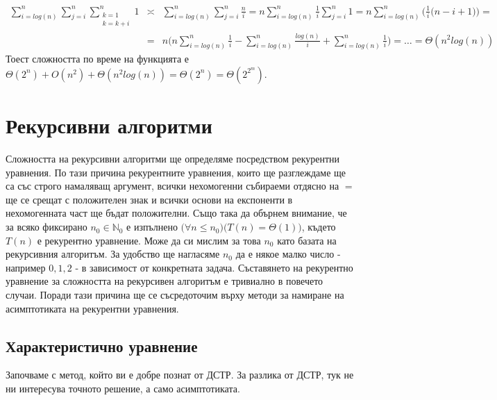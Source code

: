 \begin{solution}
	\begin{eqnarray*}
		\sum\limits_{i=log(n)}^n\sum\limits_{j=i}^n\sum\limits_{\substack{k=1\\k=k+i}}^n1 &\asymp&
		\sum\limits_{i=log(n)}^n\sum\limits_{j=i}^n\frac ni =
		n\sum\limits_{i=log(n)}^n\frac1i\sum\limits_{j=i}^n1 =
		n\sum\limits_{i=log(n)}^n\bigg(\frac1i\Big(n-i+1\Big)\bigg) = \\
		&=&
		n\Bigg(n\sum\limits_{i=log(n)}^n\frac1i-\sum\limits_{i=log(n)}^n\frac{log(n)}i+\sum\limits_{i=log(n)}^n\frac1i\Bigg) = 
		\dots =
		\Theta(n^2log(n))		
	\end{eqnarray*}
	Тоест сложността по време на функцията е $\Theta(2^n)+O(n^2)+\Theta(n^2log(n))=\Theta(2^n)=\Theta(2^{2^m})$.
\end{solution}\newpage


\section{Рекурсивни алгоритми}\label{sec-rec-alg}

Сложността на рекурсивни алгоритми ще определяме посредством рекурентни уравнения. По тази причина рекурентните уравнения, които ще разглеждаме ще са със строго намаляващ аргумент, всички нехомогенни събираеми отдясно на $=$ ще се срещат с положителен знак и всички основи на експоненти в нехомогенната част ще бъдат положителни. Също така да обърнем внимание, че за всяко фиксирано $n_0\in\mathbb{N}_0$ е изпълнено $\big(\forall n\le n_0\big)\big(T(n)=\Theta(1)\big)$, където $T(n)$ е рекурентно уравнение. Може да си мислим за това $n_0$ като базата на рекурсивния алгоритъм. За удобство ще нагласяме $n_0$ да е някое малко число - например $0,1,2$ - в зависимост от конкретната задача. Съставянето на рекурентно уравнение за сложността на рекурсивен алгоритъм е тривиално в повечето случаи. Поради тази причина ще се съсредоточим върху методи за намиране на асимптотиката на рекурентни уравнения.\\

\subsection{Характеристично уравнение}

Започваме с метод, който ви е добре познат от ДСТР. За разлика от ДСТР, тук не ни интересува точното решение, а само асимптотиката.

